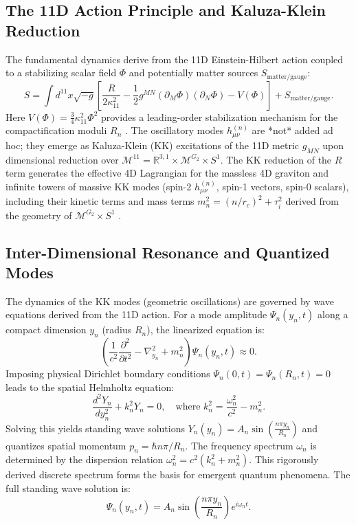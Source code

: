 \documentclass[12pt, a4paper]{article} %
\newcommand{\kappaeleven}{\kappa_{11}}
\newcommand{\mGtwo}{\mathcal{M}^{G_2}}
\begin{document}
\subsection{The 11D Action Principle and Kaluza-Klein Reduction}
The fundamental dynamics derive from the 11D Einstein-Hilbert action coupled to a stabilizing scalar field \( \Phi \) and potentially matter sources \( S_{\text{matter/gauge}} \):
\begin{equation}
S = \int d^{11}x \sqrt{-g} \left[ \frac{R}{2\kappaeleven^2} - \frac{1}{2} g^{MN} (\partial_M \Phi)(\partial_N \Phi) - V(\Phi) \right] + S_{\text{matter/gauge}}.
\label{eq:action_final_sec2_ultra}
\end{equation}
Here \(V(\Phi) = \frac{3}{4} \kappaeleven^2 \Phi^2\) provides a leading-order stabilization mechanism for the compactification moduli \(R_n\) \cite{douglas2007moduli}. The oscillatory modes \(h_{\mu\nu}^{(n)}\) are *not* added ad hoc; they emerge as Kaluza-Klein (KK) excitations of the 11D metric \(g_{MN}\) upon dimensional reduction over \( \mathcal{M}^{11} = \mathbb{R}^{3,1} \times \mGtwo \times S^1 \). The KK reduction of the \(R\) term generates the effective 4D Lagrangian for the massless 4D graviton and infinite towers of massive KK modes (spin-2 \(h_{\mu\nu}^{(n)}\), spin-1 vectors, spin-0 scalars), including their kinetic terms and mass terms \(m_n^2 = (n/r_c)^2 + \tau_i^2\) derived from the geometry of \( \mGtwo \times S^1 \) \cite{duff1986kaluza, witten1985global}.

\subsection{Inter-Dimensional Resonance and Quantized Modes}
The dynamics of the KK modes (geometric oscillations) are governed by wave equations derived from the 11D action. For a mode amplitude \(\Psi_n(y_n, t)\) along a compact dimension \(y_n\) (radius \(R_n\)), the linearized equation is:
\begin{equation}
\left( \frac{1}{c^2}\frac{\partial^2}{\partial t^2} - \nabla^2_{y_n} + m_n^2 \right) \Psi_n(y_n, t) \approx 0.
\label{eq:wave_eqn_sec2_ultra}
\end{equation}
Imposing physical Dirichlet boundary conditions \(\Psi_n(0, t) = \Psi_n(R_n, t) = 0\) leads to the spatial Helmholtz equation:
\begin{equation}
\frac{d^2 Y_n}{dy_n^2} + k_n^2 Y_n = 0, \quad \text{where } k_n^2 = \frac{\omega_n^2}{c^2} - m_n^2.
\label{eq:helmholtz_sec2_ultra}
\end{equation}
Solving this yields standing wave solutions \(Y_n(y_n) = A_n \sin\left(\frac{n\pi y_n}{R_n}\right)\) and quantizes spatial momentum \(p_n = \hbar n\pi/R_n\). The frequency spectrum \(\omega_n\) is determined by the dispersion relation \( \omega_n^2 = c^2(k_n^2 + m_n^2) \). This rigorously derived discrete spectrum forms the basis for emergent quantum phenomena. The full standing wave solution is:
\begin{equation}
\Psi_n(y_n, t) = A_n \sin\left(\frac{n\pi y_n}{R_n}\right) e^{i\omega_n t}.
\label{eq:psi_n_solution_sec2_ultra}
\end{equation}
\end{document}
